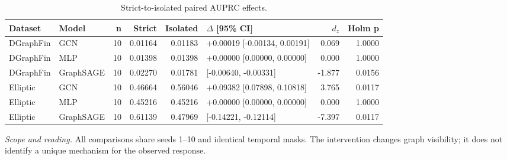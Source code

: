\begin{table}[tbp]
\centering
\footnotesize
\setlength{\tabcolsep}{3.2pt}
\renewcommand{\arraystretch}{1.12}
\caption{Strict-to-isolated paired AUPRC effects.}
\label{tab:s-protocol-auprc}
\begin{tabularx}{\textwidth}{@{}>{\raggedright\arraybackslash}p{} >{\raggedright\arraybackslash}p{} r r r >{\raggedright\arraybackslash}p{} r r@{}}
\toprule
\textbf{Dataset} & \textbf{Model} & \textbf{n} & \textbf{Strict} & \textbf{Isolated} & \textbf{$\Delta$ [95\% CI]} & \textbf{$d_z$} & \textbf{Holm p} \\
\midrule
DGraphFin & GCN & 10 & 0.01164 & 0.01183 & +0.00019 [-0.00134, 0.00191] & 0.069 & 1.0000 \\
DGraphFin & MLP & 10 & 0.01398 & 0.01398 & +0.00000 [0.00000, 0.00000] & 0.000 & 1.0000 \\
DGraphFin & GraphSAGE & 10 & 0.02270 & 0.01781 & -0.00489 [-0.00640, -0.00331] & -1.877 & 0.0156 \\
Elliptic & GCN & 10 & 0.46664 & 0.56046 & +0.09382 [0.07898, 0.10818] & 3.765 & 0.0117 \\
Elliptic & MLP & 10 & 0.45216 & 0.45216 & +0.00000 [0.00000, 0.00000] & 0.000 & 1.0000 \\
Elliptic & GraphSAGE & 10 & 0.61139 & 0.47969 & -0.13170 [-0.14221, -0.12114] & -7.397 & 0.0117 \\
\bottomrule
\end{tabularx}
\vspace{2pt}
\begin{minipage}{\textwidth}\footnotesize\emph{Scope and reading.} All comparisons share seeds 1--10 and identical temporal masks. The intervention changes graph visibility; it does not identify a unique mechanism for the observed response.\end{minipage}
\end{table}
